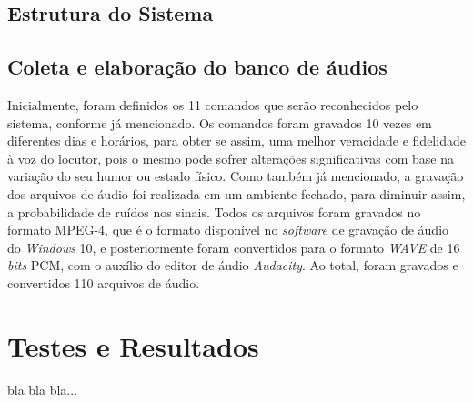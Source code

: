 \documentclass[a4paper,12pt,twoside,openright]{report}
\begin{document}
\section{Estrutura do Sistema}
\label{estrutura_sistema}

\section{Coleta e elabora{\c c}\~{a}o do banco de \'{a}udios}
\par Inicialmente, foram definidos os 11 comandos que ser\~{a}o reconhecidos pelo sistema, conforme j\'{a} mencionado. Os comandos foram gravados 10 vezes em diferentes dias e hor\'{a}rios, para obter se assim, uma melhor veracidade e fidelidade \`{a} voz do locutor, pois o mesmo pode sofrer altera{\c c}\~{o}es significativas com base na varia{\c c}\~{a}o do seu humor ou estado f\'{i}sico. Como tamb\'{e}m j\'{a} mencionado, a grava{\c c}\~{a}o dos arquivos de \'{a}udio foi realizada em um ambiente fechado, para diminuir assim, a probabilidade de ru\'{i}dos nos sinais. Todos os arquivos foram gravados no formato MPEG-4, que \'{e} o formato dispon\'{i}vel no \textit{software} de grava{\c c}\~{a}o de \'{a}udio do \textit{Windows} 10, e posteriormente foram convertidos para o formato \textit{WAVE} de 16 \textit{bits} PCM, com o aux\'{i}lio do editor de \'{a}udio \textit{Audacity}. Ao total, foram gravados e convertidos 110 arquivos de \'{a}udio.
\chapter{Testes e Resultados}
\label{cap4}
\thispagestyle{myheadings}
bla bla bla...
\end{document}
